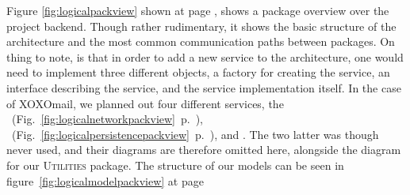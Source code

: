 Figure \ref{fig:logicalpackview} shown at page \pageref{fig:logicalpackview}, shows a package overview over the project backend. Though rather rudimentary, it shows the basic structure of the architecture and the most common communication paths between packages. On thing to note, is that in order to add a new service to the architecture, one would need to implement three different objects, a factory for creating the service, an interface describing the service, and the service implementation itself.
\newline
\newline
In the case of XOXOmail, we planned out four different services, the ~(Fig.~\ref{fig:logicalnetworkpackview}~p.~\pageref{fig:logicalnetworkpackview}), ~(Fig.~\ref{fig:logicalpersistencepackview}~p.~\pageref{fig:logicalpersistencepackview}),  and . The two latter was though never used, and their diagrams are therefore omitted here, alongside the diagram for our \textsc{Utilities} package. The structure of our models can be seen in figure~\ref{fig:logicalmodelpackview} at page \pageref{fig:logicalmodelpackview}

